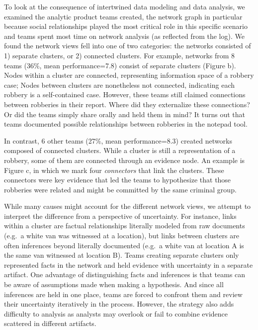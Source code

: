 \documentclass[]{article}
\begin{document}
To look at the consequence of intertwined data modeling and data
analysis, we examined the analytic product teams created, the network
graph in particular because social relationships played the most
critical role in this specific scenario and teams spent most time on
network analysis (as reflected from the log). We found the network views
fell into one of two categories: the networks consisted of 1) separate
clusters, or 2) connected clusters. For example, networks from 8 teams
(36\%, mean performance=7.8) consist of separate clusters (Figure
\autocite{fig:network}b). Nodes within a cluster are connected,
representing information space of a robbery case; Nodes between clusters
are nonetheless not connected, indicating each robbery is a
self-contained case. However, these teams still claimed connections
between robberies in their report. Where did they externalize these
connections? Or did the teams simply share orally and held them in mind?
It turns out that teams documented possible relationships between
robberies in the notepad tool.

In contrast, 6 other teams (27\%, mean performance=8.3) created networks
composed of connected clusters. While a cluster is still a
representation of a robbery, some of them are connected through an
evidence node. An example is Figure \autocite{fig:network}c, in which we
mark four \emph{connectors} that link the clusters. These connectors
were key evidence that led the teams to hypothesize that those robberies
were related and might be committed by the same criminal group.

While many causes might account for the different network views, we
attempt to interpret the difference from a perspective of uncertainty.
For instance, links within a cluster are factual relationships literally
modeled from raw documents (e.g.~a white van was witnessed at a
location), but links between clusters are often inferences beyond
literally documented (e.g.~a white van at location A is the same van
witnessed at location B). Teams creating separate clusters only
represented facts in the network and held evidence with uncertainty in a
separate artifact. One advantage of distinguishing facts and inferences
is that teams can be aware of assumptions made when making a hypothesis.
And since all inferences are held in one place, teams are forced to
confront them and review their uncertainty iteratively in the process.
However, the strategy also adds difficulty to analysis as analysts may
overlook or fail to combine evidence scattered in different artifacts.
\end{document}
